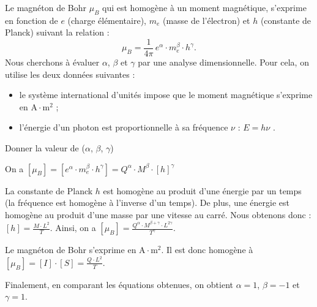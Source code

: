 
\hauteurLargeurCadreReponse		{8mm}{4cm}
\initialisationEntrainement
% 

\debutEntrainement

Le magnéton de Bohr $\mu_B$ qui est homogène à un moment magnétique, s'exprime en fonction de $e$ (charge élémentaire), $m_e$ (masse de l'électron) et $h$ (constante de Planck) suivant la relation : 
\[
\mu_B=\frac{1}{4\pi}\, e^{\alpha}\cdot m_e^{\beta}\cdot h^{\gamma}.
\]
Nous cherchons à évaluer $\alpha$, $\beta$ et $\gamma$ par une analyse dimensionnelle. Pour cela, on utilise les deux 
données suivantes : 
\begin{itemize}
	\item le système international d'unités impose que le moment magnétique s'exprime en $\si{\ampere \cdot \metre^2}$ ; 
	\item  l'énergie d'un photon est proportionnelle à sa fréquence $\nu$ : $E=h\nu$ .
\end{itemize} 


\begin{enonce}
Donner la valeur de ($\alpha$, $\beta$, $\gamma$)
\end{enonce}


\begin{corrige}
On a $[\mu_B]=\left[e^{\alpha}\cdot m_e^{\beta}\cdot h^{\gamma}\right]=Q^{\alpha}\cdot M^{\beta}\cdot \left[h\right]^{\gamma}$ 

La constante de Planck $h$ est homogène au produit d'une énergie par un temps (la fréquence est homogène à l'inverse d'un temps). De plus, une énergie est homogène au produit d'une masse par une vitesse au carré. Nous obtenons donc : 
$[h]=\frac{M\cdot L^2}{T}$.
Ainsi, on a $[\mu_B]=\frac{Q^{\alpha}\cdot M^{\beta+\gamma}\cdot L^{2\gamma}}{T^{\gamma}}$.

Le magnéton de Bohr s'exprime en $\si{\ampere \cdot \metre^2}$. Il est donc homogène à $[\mu_B]=\left[I\right]\cdot \left[S\right]=\frac{Q\cdot L^2}{T}$.

Finalement, en comparant les équations obtenues, on obtient $\alpha=1$, $\beta=-1$ et $\gamma=1$. 
\end{corrige}

